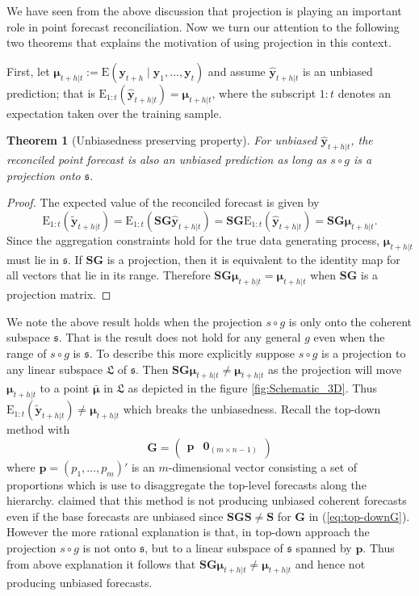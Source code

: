 \documentclass[12pt]{article}
\def\E{\text{E}}
\newtheorem{theo}{Theorem}[section]
\theoremstyle{definition}
\begin{document}
	We have seen from the above discussion that projection is playing an important role in point forecast reconciliation. Now we turn our attention to the following two theorems that explains the motivation of using projection in this context. 
	
	First, let $\bm{\mu}_{t+h|t}:=\E(\bm{y}_{t+h}\mid\bm{y}_{1},\dots,\bm{y}_{t})$ and assume $\hat{\bm{y}}_{t+h|t}$ is an unbiased prediction; that is $\E_{1:t}(\hat{\bm{y}}_{t+h|t})=\bm{\mu}_{t+h|t}$, where the subscript $1:t$ denotes an expectation taken over the training sample.
	
	\begin{theo}[Unbiasedness preserving property]
		For unbiased $\hat{\bm{y}}_{t+h|t}$, the reconciled point forecast is also an unbiased prediction as long as $s\circ g$ is a projection onto $\mathfrak{s}$.
	\end{theo}
	\begin{proof}
		The expected value of the reconciled forecast is given by
		\[
		\E_{1:t}(\tilde{\bm{y}}_{t+h|t})
		= \E_{1:t}(\bm{S}\bm{G}\hat{\bm{y}}_{t+h|t})
		= \bm{S}\bm{G}\E_{1:t}(\hat{\bm{y}}_{t+h|t})
		= \bm{S}\bm{G}\bm{\mu}_{t+h|t}.
		\]
		Since the aggregation constraints hold for the true data generating process, $\bm{\mu}_{t+h|t}$ must lie in $\mathfrak{s}$. If $\bm{S}\bm{G}$ is a projection, then it is equivalent to the identity map for all vectors that lie in its range. Therefore $\bm{S}\bm{G}\bm{\mu}_{t+h|t}=\bm{\mu}_{t+h|t}$ when $\bm{S}\bm{G}$ is a projection matrix.
	\end{proof}

	We note the above result holds when the projection $s\circ g$ is only onto the coherent subspace $\mathfrak{s}$. That is the result does not hold for any general $g$ even when the range of $s\circ g$ is $\mathfrak{s}$. To describe this more explicitly suppose $s\circ g$ is a projection to any linear subspace $\mathfrak{L}$ of $\mathfrak{s}$. Then $\bm{S}\bm{G}\bm{\mu}_{t+h|t} \ne \bm{\mu}_{t+h|t}$ as the projection will move $\bm{\mu}_{t+h|t}$ to a point $\bar{\bm{\mu}}$ in $\mathfrak{L}$ as depicted in the figure \ref{fig:Schematic_3D}. Thus $\E_{1:t}(\tilde{\bm{y}}_{t+h|t}) \ne \bm{\mu}_{t+h|t}$ which breaks the unbiasedness. Recall the top-down method \citep{Gross1990} with 
	\begin{equation}\label{eq:top-downG}
	\bm{G}=\begin{pmatrix}
	\bm{p} & \bm{0}_{(m \times n-1)}
	\end{pmatrix}
	\end{equation}
    where $\bm{p} = (p_1,\dots,p_m)'$ is an $m$-dimensional vector consisting a set of proportions which is use to disaggregate the top-level forecasts along the hierarchy. \cite{Hyndman2011} claimed that this method is not producing unbiased coherent forecasts even if the base forecasts are unbiased since $\bm{SGS} \ne \bm{S}$ for $\bm{G}$ in (\ref{eq:top-downG}). However the more rational explanation is that, in top-down approach the projection $s\circ g$ is not onto $\mathfrak{s}$, but to a linear subspace of $\mathfrak{s}$ spanned by $\bm{p}$. Thus from above explanation it follows that  $\bm{S}\bm{G}\bm{\mu}_{t+h|t} \ne \bm{\mu}_{t+h|t}$ and hence not producing unbiased forecasts. 
	
\end{document}
